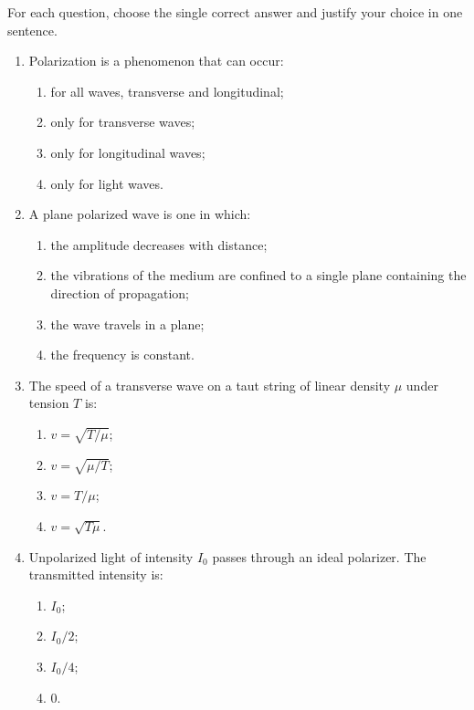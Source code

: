 \documentclass[11pt]{article}
\begin{document}
\begin{exercice}
For each question, choose the single correct answer and justify your choice in one sentence.
\begin{enumerate}
\item Polarization is a phenomenon that can occur:
\begin{enumerate}
\item for all waves, transverse and longitudinal;
\item only for transverse waves;
\item only for longitudinal waves;
\item only for light waves.
\end{enumerate}
\item A plane polarized wave is one in which:
\begin{enumerate}
\item the amplitude decreases with distance;
\item the vibrations of the medium are confined to a single plane containing the direction of propagation;
\item the wave travels in a plane;
\item the frequency is constant.
\end{enumerate}
\item The speed of a transverse wave on a taut string of linear density $\mu$ under tension $T$ is:
\begin{enumerate}
\item $v = \sqrt{T/\mu}$;
\item $v = \sqrt{\mu/T}$;
\item $v = T/\mu$;
\item $v = \sqrt{T\mu}$.
\end{enumerate}
\item Unpolarized light of intensity $I_0$ passes through an ideal polarizer. The transmitted intensity is:
\begin{enumerate}
\item $I_0$;
\item $I_0/2$;
\item $I_0/4$;
\item $0$.
\end{enumerate}
\end{enumerate}
\end{exercice}
\end{document}
